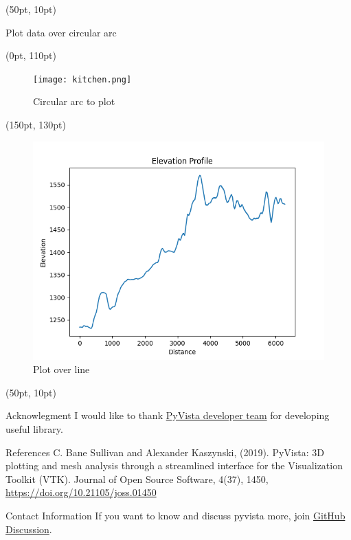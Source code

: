 \documentclass[aspectratio=169,12pt]{beamer}
\begin{document}
\begin{frame}[fragile]
\begin{textblock*}{350pt}(50pt, 10pt)
\begin{block}{Plot data over circular arc}

\end{block}
\end{textblock*}
\begin{textblock*}{300pt}(0pt, 110pt)
\begin{block}{}
\begin{figure}
\texttt{[image: kitchen.png]}
\caption{Circular arc to plot \label{CircularArcToPlotFigure}}
\end{figure}
\end{block}
\end{textblock*}
\begin{textblock*}{350pt}(150pt, 130pt)
\begin{figure}
\includegraphics[width=0.3\linewidth]{elevation.png}
\caption{Plot over line \label{PlotOverCircularArcFigure}}
\end{figure}
\end{textblock*}
\end{frame}

\begin{frame}[fragile]
\begin{textblock*}{350pt}(50pt, 10pt)
\begin{block}{Acknowlegment}
I would like to thank \href{https://github.com/orgs/pyvista/teams/developers}{PyVista developer team} for developing useful library.
\end{block}
\begin{block}{References}
C. Bane Sullivan and Alexander Kaszynski, (2019). PyVista: 3D plotting and mesh analysis through a streamlined interface for the Visualization Toolkit (VTK). Journal of Open Source Software, 4(37), 1450, \url{https://doi.org/10.21105/joss.01450}
\end{block}
\begin{block}{Contact Information}
If you want to know and discuss pyvista more, join \href{http://github.com/pyvista/pyvista/discussions}{GitHub Discussion}.
\end{block}
\doclicenseThis
\end{textblock*}
\end{frame}
\end{document}
